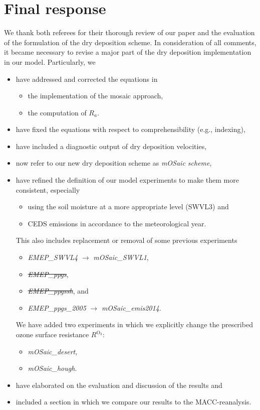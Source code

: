 
%
\section*{Final response}
We thank both referees for their thorough review of our paper and the evaluation of the formulation of the dry deposition scheme.
In consideration of all comments, it became necessary to revise a major part of the dry deposition implementation in our model. Particularly, we  
\begin{itemize}
\item have addressed and corrected the equations in
  \begin{itemize}
  \item the implementation of the mosaic approach,
  \item the computation of $R_a$.
  \end{itemize}
  \item have fixed the equations with respect to comprehensibility (e.g., indexing),
  \item have included a diagnostic output of dry deposition velocities,
  \item now refer to our new dry deposition scheme as \emph{mOSaic scheme},
  \item have refined the definition of our model experiments to make them more consistent, especially
    \begin{itemize}
    \item using the soil moisture at a more appropriate level (SWVL3) and
    \item CEDS emissions in accordance to the meteorological year.
    \end{itemize}
    This also includes replacement or removal of some previous experiments
    \begin{itemize}
    \item \emph{EMEP\_SWVL4} $\rightarrow$ \emph{mOSaic\_SWVL1},
    \item \sout{\emph{EMEP\_ppgs}},
    \item \sout{\emph{EMEP\_ppgssh}}, and
    \item \emph{EMEP\_ppgs\_2005} $\rightarrow$ \emph{mOSaic\_emis2014}.
    \end{itemize}
    We have added two experiments in which we explicitly change the prescribed ozone surface resistance $R^\mathrm{O_3}$:
    \begin{itemize}
    \item \emph{mOSaic\_desert},
    \item\emph{mOSaic\_hough}.
    \end{itemize}
  \item have elaborated on the evaluation and discussion of the results and
  \item included a section in which we compare our results to the MACC-reanalysis.
\end{itemize}
